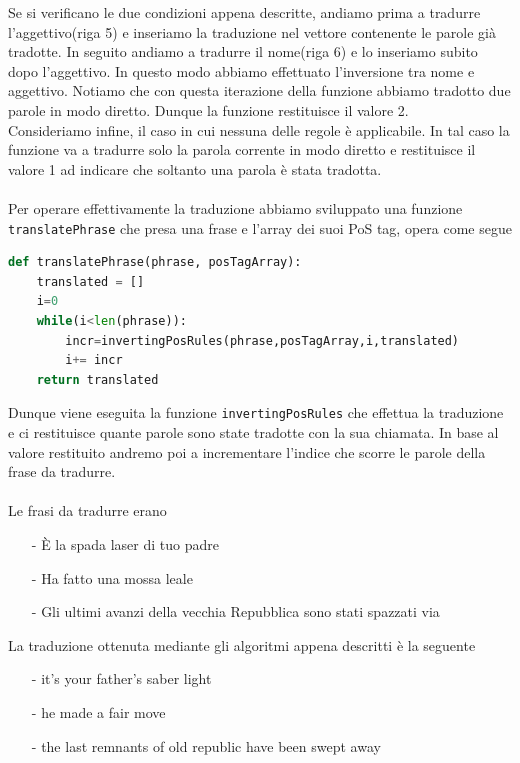 \documentclass[10pt]{article}
\begin{document}
Se si verificano le due condizioni appena descritte, andiamo prima a tradurre l'aggettivo(riga 5) e inseriamo la traduzione nel vettore contenente le parole già tradotte. In seguito andiamo a tradurre il nome(riga 6) e lo inseriamo subito dopo l'aggettivo. In questo modo abbiamo effettuato l'inversione tra nome e aggettivo. Notiamo che con questa iterazione della funzione abbiamo tradotto due parole in modo diretto. Dunque la funzione restituisce il valore 2.\\ 
Consideriamo infine, il caso in cui nessuna delle regole è applicabile. In tal caso la funzione va a tradurre solo la parola corrente in modo diretto e restituisce il valore 1 ad indicare che soltanto una parola è stata tradotta.\\
\\
Per operare effettivamente la traduzione abbiamo sviluppato una funzione\\ \texttt{translatePhrase} che presa una frase e l'array dei suoi PoS tag, opera come segue

\begin{lstlisting}[language=Python]
def translatePhrase(phrase, posTagArray):
    translated = []
    i=0
    while(i<len(phrase)):
        incr=invertingPosRules(phrase,posTagArray,i,translated)
        i+= incr
    return translated
\end{lstlisting}

\noindent Dunque viene eseguita la funzione \texttt{invertingPosRules} che effettua la traduzione e ci restituisce quante parole sono state tradotte con la sua chiamata. In base al valore restituito andremo poi a incrementare l'indice che scorre le parole della frase da tradurre.\\
\\
Le frasi da tradurre erano 
\begin{itemize}
	\item[-] È la spada laser di tuo padre
	\item[-] Ha fatto una mossa leale
	\item[-] Gli ultimi avanzi della vecchia Repubblica sono stati spazzati via
\end{itemize}

\noindent La traduzione ottenuta mediante gli algoritmi appena descritti è la seguente

\begin{itemize}
	\item[-] it's your father's saber light 
	\item[-] he made a fair move 
	\item[-] the last remnants of old republic have been swept away
\end{itemize}
\end{document}

